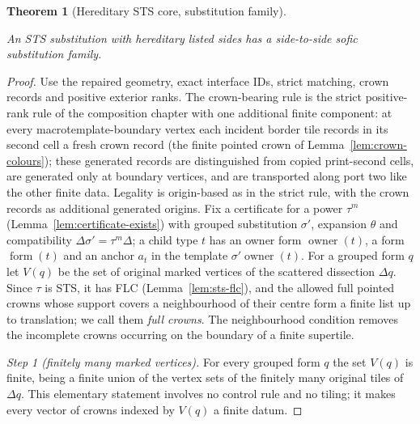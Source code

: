 \documentclass[11pt,a4paper]{article}
\newtheorem{theorem}[definition]{Theorem}
\theoremstyle{remark}
\newcommand{\lean}[1]{}
\newcommand{\uses}[1]{}
\begin{document}
\begin{theorem}[Hereditary STS core, substitution family]\label{thm:hereditary-substitution}
\lean{Tilings.Core.hereditary_sts_substitution_sofic}
\uses{def:hereditary,def:sts,lem:sts-flc,lem:certificate-exists,lem:substitution-hierarchy,lem:grouping-lift,lem:crown-colours,lem:allowed-hierarchy,lem:glues,thm:compose}
An STS substitution with hereditary listed sides has a side-to-side sofic
substitution family.
\end{theorem}
\begin{proof}
Use the repaired geometry, exact interface IDs, strict matching, crown
records and positive exterior ranks.  The crown-bearing rule is the strict
positive-rank rule of the composition chapter with one additional finite
component: at every macrotemplate-boundary vertex each incident border
tile records in its second cell a fresh crown record (the finite pointed
crown of Lemma~\ref{lem:crown-colours}); these generated records are
distinguished from copied print-second cells, are generated only at
boundary vertices, and are transported along port two like the other
finite data.  Legality is origin-based as in the strict rule, with the
crown records as additional generated origins.  Fix a certificate for a
power $\tau^m$ (Lemma~\ref{lem:certificate-exists}) with grouped
substitution $\sigma'$, expansion $\theta$ and compatibility
$\Delta\sigma'=\tau^m\Delta$; a child type $t$ has an owner form
$\operatorname{owner}(t)$, a form $\operatorname{form}(t)$ and an anchor
$a_t$ in the template $\sigma'\operatorname{owner}(t)$.  For a grouped
form $q$ let $V(q)$ be the set of original marked vertices of the scattered
dissection $\Delta q$.  Since $\tau$ is STS, it has FLC
(Lemma~\ref{lem:sts-flc}), and the allowed full pointed crowns whose
support covers a neighbourhood of their centre form a finite list up to
translation; we call them \emph{full crowns}.  The neighbourhood condition
removes the incomplete crowns occurring on the boundary of a finite
supertile.

\emph{Step 1 (finitely many marked vertices).}  For every grouped form
$q$ the set $V(q)$ is finite, being a finite union of the vertex sets of the
finitely many original tiles of $\Delta q$.  This elementary statement
involves no control rule and no tiling; it makes every vector of crowns
indexed by $V(q)$ a finite datum.


\end{proof}
\end{document}

